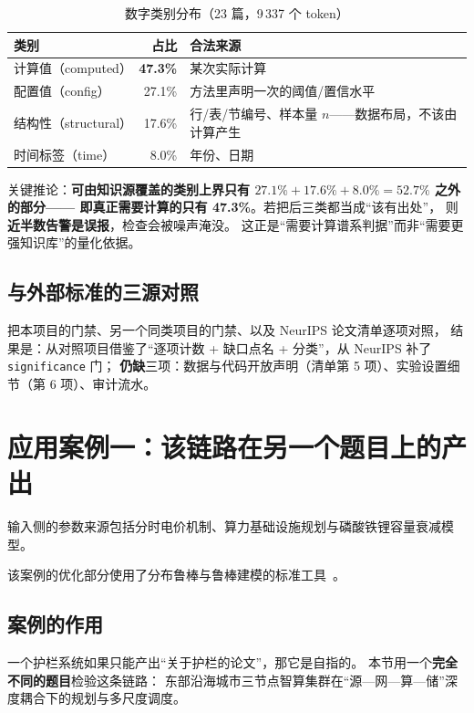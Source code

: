 \documentclass[11pt,a4paper]{article}
\newcommand{\code}[1]{\texttt{#1}}
\begin{document}
\begin{table}[tbp]\centering\small
\caption{数字类别分布（23 篇，9\,337 个 token）}\label{tab:genre}
\setlength{\tabcolsep}{4pt}
\begin{tabular}{lrl}
\toprule
类别 & 占比 & 合法来源\\
\midrule
计算值（computed） & \textbf{47.3\%} & 某次实际计算\\
配置值（config） & 27.1\% & 方法里声明一次的阈值/置信水平\\
结构性（structural） & 17.6\% & 行/表/节编号、样本量 $n$——数据布局，不该由计算产生\\
时间标签（time） & 8.0\% & 年份、日期\\
\bottomrule
\end{tabular}
\end{table}

关键推论：\textbf{可由知识源覆盖的类别上界只有 $27.1\%+17.6\%+8.0\% = 52.7\%$ 之外的部分——
即真正需要计算的只有 47.3\%}。若把后三类都当成“该有出处”，
则\textbf{近半数告警是误报}，检查会被噪声淹没。
这正是“需要计算谱系判据”而非“需要更强知识库”的量化依据。

\subsection{与外部标准的三源对照}
把本项目的门禁、另一个同类项目的门禁、以及 NeurIPS 论文清单逐项对照，
结果是：从对照项目借鉴了“逐项计数 + 缺口点名 + 分类”，从 NeurIPS 补了 \code{significance} 门；
\textbf{仍缺}三项：数据与代码开放声明（清单第 5 项）、实验设置细节（第 6 项）、审计流水。

\section{应用案例一：该链路在另一个题目上的产出}\label{sec:case1}
输入侧的参数来源包括分时电价机制\cite{ref10}、算力基础设施规划\cite{ref11}与磷酸铁锂容量衰减模型\cite{ref12}。

该案例的优化部分使用了分布鲁棒与鲁棒建模的标准工具~\cite{ref6,ref7,ref8}。

\subsection{案例的作用}
一个护栏系统如果只能产出“关于护栏的论文”，那它是自指的。
本节用一个\textbf{完全不同的题目}检验这条链路：
东部沿海城市三节点智算集群在“源—网—算—储”深度耦合下的规划与多尺度调度。
\end{document}
